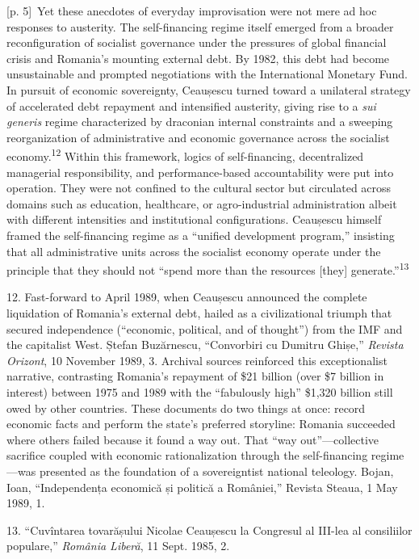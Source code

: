 \documentclass[10pt,a4paper]{article}
\begin{document}
{\scriptsize\color{gray} [p. 5]}\ Yet these anecdotes of everyday improvisation were not mere ad hoc responses to austerity. The self-financing regime itself emerged from a broader reconfiguration of socialist governance under the pressures of global financial crisis and Romania’s mounting external debt. By 1982, this debt had become unsustainable and prompted negotiations with the International Monetary Fund. In pursuit of economic sovereignty, Ceaușescu turned toward a unilateral strategy of accelerated debt repayment and intensified austerity, giving rise to a \textit{sui generis} regime characterized by draconian internal constraints and a sweeping reorganization of administrative and economic governance across the socialist economy.\nobreak\textsuperscript{12} Within this framework, logics of self-financing, decentralized managerial responsibility, and performance-based accountability were put into operation. They were not confined to the cultural sector but circulated across domains such as education, healthcare, or agro-industrial administration albeit with different intensities and institutional configurations. Ceaușescu himself framed the self-financing regime as a “unified development program,” insisting that all administrative units across the socialist economy operate under the principle that they should not “spend more than the resources [they] generate.”\nobreak\textsuperscript{13}\par{\small 12. Fast-forward to April 1989, when Ceaușescu announced the complete liquidation of Romania’s external debt, hailed as a civilizational triumph that secured independence (“economic, political, and of thought”) from the IMF and the capitalist West. Ștefan Buzărnescu, “Convorbiri cu Dumitru Ghișe,” \textit{Revista Orizont}, 10 November 1989, 3. Archival sources reinforced this exceptionalist narrative, contrasting Romania’s repayment of \$21 billion (over \$7 billion in interest) between 1975 and 1989 with the “fabulously high” \$1,320 billion still owed by other countries. These documents do two things at once: record economic facts and perform the state’s preferred storyline: Romania succeeded where others failed because it found a way out. That “way out”—collective sacrifice coupled with economic rationalization through the self-financing regime—was presented as the foundation of a sovereigntist national teleology. Bojan, Ioan, “Independența economică și politică a României,” Revista Steaua, 1 May 1989, 1.\par}{\small 13. “Cuvîntarea tovarășului Nicolae Ceaușescu la Congresul al III-lea al consiliilor populare,” \textit{România Liberă}, 11 Sept. 1985, 2.\par}
\end{document}
